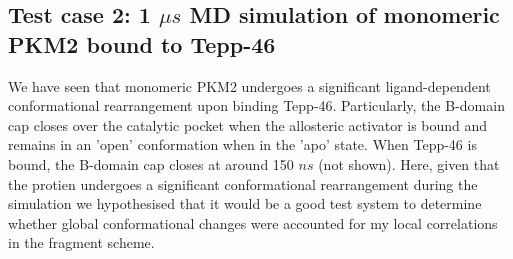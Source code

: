 \documentclass[11pt]{article}
\begin{document}
\subsection*{Test case 2: 1 $\mu s$ MD simulation of monomeric PKM2 bound to Tepp-46}
We have seen that monomeric PKM2 undergoes a significant ligand-dependent conformational rearrangement upon binding Tepp-46. Particularly, the B-domain cap closes over the catalytic pocket when the allosteric activator is bound and remains in an 'open' conformation when in the 'apo' state. When Tepp-46 is bound, the B-domain cap closes at around 150 $ns$ (not shown). Here, given that the protien undergoes a significant conformational rearrangement during the simulation we hypothesised that it would be a good test system to determine whether global conformational changes were accounted for my local correlations in the fragment scheme.
\end{document}
